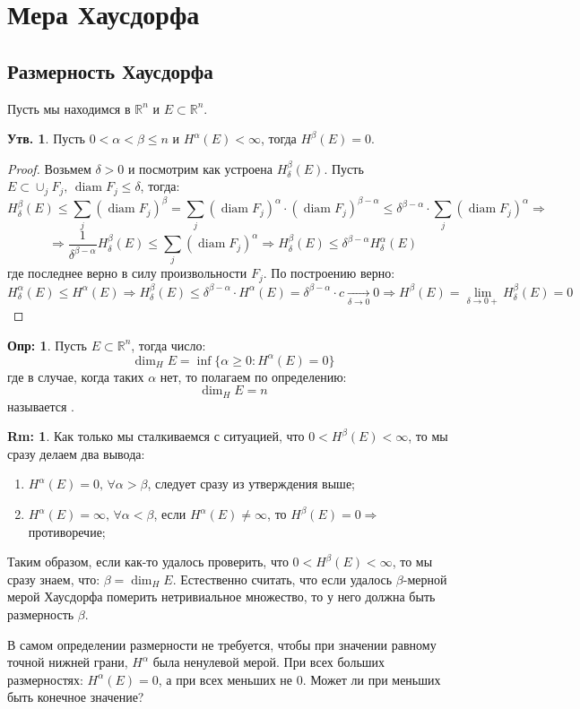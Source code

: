 \documentclass[12pt]{article}
\newcommand{\RN}[1]{%
	\textup{\uppercase\expandafter{\romannumeral#1}}%
}
\newcommand{\MR}{\mathbb{R}}
\theoremstyle{definition}
\newtheorem{defn}{Опр:}
\newtheorem{rem}{Rm:}
\newtheorem{prop}{Утв.}
\DeclareMathOperator{\diam}{\text{diam}}
\newcommand{\ddsum}[2]{\displaystyle\sum\limits_{#1}^{#2}}
\begin{document}
\lhead{Математический анализ - \RN{4}}
\section*{Мера Хаусдорфа}
\subsection*{Размерность Хаусдорфа}
Пусть мы находимся в $\MR^n$ и $E \subset \MR^n$.
\begin{prop}
	Пусть $0 < \alpha < \beta \leq n$ и $H^\alpha(E) < \infty$, тогда $H^\beta(E) = 0$.
\end{prop}
\begin{proof}
	Возьмем $\delta > 0$ и посмотрим как устроена $H_\delta^\beta(E)$. Пусть $E \subset \cup_j F_j, \, \diam{F_j} \leq \delta$, тогда:
	$$
		H_\delta^\beta(E) \leq \ddsum{j}{}(\diam{F_j})^\beta = \ddsum{j}{}(\diam{F_j})^{\alpha}{\cdot}(\diam{F_j})^{\beta - \alpha} \leq\delta^{\beta - \alpha}{\cdot} \ddsum{j}{}(\diam{F_j})^{\alpha} \Rightarrow
	$$
	$$
		\Rightarrow \dfrac{1}{\delta^{\beta - \alpha}}H_\delta^\beta(E) \leq \ddsum{j}{}(\diam{F_j})^{\alpha} \Rightarrow H_\delta^\beta(E) \leq \delta^{\beta - \alpha}H_\delta^\alpha(E)
	$$
	где последнее верно в силу произвольности $F_j$. По построению верно:
	$$
		H_\delta^\alpha(E) \leq H^\alpha(E) \Rightarrow H_\delta^\beta(E) \leq \delta^{\beta - \alpha}{\cdot} H^\alpha(E) = \delta^{\beta - \alpha}{\cdot}c \xrightarrow[\delta \to 0]{} 0 \Rightarrow H^\beta(E) = \lim\limits_{\delta \to 0+} H_\delta^\beta(E)  = 0
	$$
\end{proof}

\begin{defn}
	Пусть $E\subset \MR^n$, тогда число: 
	$$
		\dim_H{E} = \inf\{\alpha \geq 0 \colon H^\alpha(E) = 0\}
	$$
	где в случае, когда таких $\alpha$ нет, то полагаем по определению: 
	$$
		\dim_H{E} = n
	$$ 
	называется .
\end{defn}

\begin{rem}
	Как только мы сталкиваемся с ситуацией, что $0 < H^\beta(E) < \infty$, то мы сразу делаем два вывода:
	\begin{enumerate}[label = \arabic*)]
		\item $H^\alpha(E) = 0, \, \forall \alpha > \beta$, следует сразу из утверждения выше;
		\item $H^\alpha(E) = \infty,  \, \forall \alpha < \beta$, если $H^\alpha(E) \neq \infty$, то $H^\beta(E) = 0 \Rightarrow$ противоречие;
	\end{enumerate}
	Таким образом, если как-то удалось проверить, что $0 < H^\beta(E) < \infty$, то мы сразу знаем, что: $\beta = \dim_H{E}$. Естественно считать, что если удалось $\beta$-мерной мерой Хаусдорфа померить нетривиальное множество, то у него должна быть размерность $\beta$. 
	
	В самом определении размерности не требуется, чтобы при значении равному точной нижней грани, $H^\alpha$ была ненулевой мерой. При всех больших размерностях: $H^\alpha(E) = 0$, а при всех меньших не $0$. Может ли при меньших быть конечное значение?
\end{rem}
\end{document}
